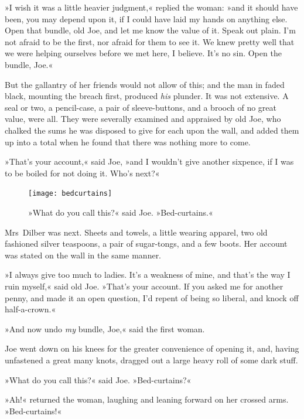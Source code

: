 »I wish it was a little heavier judgment,« replied the woman: »and it should have been, you may depend upon it, if I could have laid my hands on anything else. Open that bundle, old Joe, and let me know the value of it. Speak out plain. I'm not afraid to be the first, nor afraid for them to see it. We knew pretty well that we were helping ourselves before we met here, I believe. It's no sin. Open the bundle, Joe.«

But the gallantry of her friends would not allow of this; and the man in faded black, mounting the breach first, produced \textit{his} plunder. It was not extensive. A seal or two, a pencil-case, a pair of sleeve-buttons, and a brooch of no great value, were all. They were severally examined and appraised by old Joe, who chalked the sums he was disposed to give for each upon the wall, and added them up into a total when he found that there was nothing more to come.

»That's your account,« said Joe, »and I wouldn't give another sixpence, if I was to be boiled for not doing it. Who's next?«

\begin{figure}[p]
\begin{minipage}[c]{\textwidth}
\texttt{[image: bedcurtains]}
\caption[\textbf{»Bed-curtains.«}]{»What do you call this?« said Joe. »Bed-curtains.«}
\end{minipage}
\end{figure}

Mrs~Dilber was next. Sheets and towels, a little wearing apparel, two old fashioned silver teaspoons, a pair of sugar-tongs, and a few boots. Her account was stated on the wall in the same manner.

»I always give too much to ladies. It's a weakness of mine, and that's the way I ruin myself,« said old Joe. »That's your account. If you asked me for another penny, and made it an open question, I'd repent of being so liberal, and knock off half-a-crown.«

»And now undo \textit{my} bundle, Joe,« said the first woman.

Joe went down on his knees for the greater convenience of opening it, and, having unfastened a great many knots, dragged out a large heavy roll of some dark stuff.

»What do you call this?« said Joe. »Bed-curtains?«

»Ah!« returned the woman, laughing and leaning forward on her crossed arms. »Bed-curtains!«

